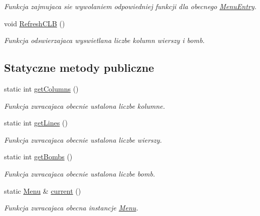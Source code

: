 \begin{DoxyCompactItemize}
\begin{DoxyCompactList}\small\item\em Funkcja zajmujaca sie wywolaniem odpowiedniej funkcji dla obecnego \hyperlink{class_menu_entry}{Menu\+Entry}. \end{DoxyCompactList}\item 
\hypertarget{class_menu_a1166aeaa1849a13d80291ea0a734415f}{}void \hyperlink{class_menu_a1166aeaa1849a13d80291ea0a734415f}{Refresh\+C\+L\+B} ()\label{class_menu_a1166aeaa1849a13d80291ea0a734415f}

\begin{DoxyCompactList}\small\item\em Funkcja odswierzajaca wyswietlana liczbe kolumn wierszy i bomb. \end{DoxyCompactList}\end{DoxyCompactItemize}
\subsection*{Statyczne metody publiczne}
\begin{DoxyCompactItemize}
\item 
static int \hyperlink{class_menu_a7b0fbc17641f35b4d5cdab708b14c659}{get\+Columns} ()
\begin{DoxyCompactList}\small\item\em Funkcja zwracajaca obecnie ustalona liczbe kolumne. \end{DoxyCompactList}\item 
static int \hyperlink{class_menu_a36ba53f24eacd853bc98da7a4fff291d}{get\+Lines} ()
\begin{DoxyCompactList}\small\item\em Funkcja zwracajaca obecnie ustalona liczbe wierszy. \end{DoxyCompactList}\item 
static int \hyperlink{class_menu_a4654d30d5950859f8cd3ca4bb4d6774a}{get\+Bombs} ()
\begin{DoxyCompactList}\small\item\em Funkcja zwracajaca obecnie ustalona liczbe bomb. \end{DoxyCompactList}\item 
static \hyperlink{class_menu}{Menu} \& \hyperlink{class_menu_a2388f6a7d18a9866cb81a8741d2dc2d2}{current} ()
\begin{DoxyCompactList}\small\item\em Funkcja zwracajaca obecna instancje \hyperlink{class_menu}{Menu}. \end{DoxyCompactList}\end{DoxyCompactItemize}


